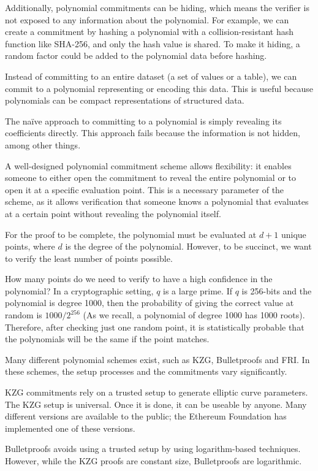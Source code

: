 Additionally, polynomial commitments can be hiding, which means the verifier is not exposed to any information about the polynomial.
For example, we can create a commitment by hashing a polynomial with a collision-resistant hash function like SHA-256, and only the hash value is shared. 
To make it hiding, a random factor could be added to the polynomial data before hashing.

Instead of committing to an entire dataset (a set of values or a table), we can commit to a polynomial representing or encoding this data. 
This is useful because polynomials can be compact representations of structured data.

The naïve approach to committing to a polynomial is simply revealing its coefficients directly.
This approach fails because the information is not hidden, among other things.

A well-designed polynomial commitment scheme allows flexibility: it enables someone to either open the commitment to reveal the entire polynomial or to open it at a specific evaluation point. 
This is a necessary parameter of the scheme, as it allows verification that someone knows a polynomial that evaluates at a certain point without revealing the polynomial itself.

For the proof to be complete, the polynomial must be evaluated at $d+1$ unique points, where $d$ is the degree of the polynomial.
However, to be succinct, we want to verify the least number of points possible.

How many points do we need to verify to have a high confidence in the polynomial?
In a cryptographic setting, $q$ is a large prime. If $q$ is 256-bits and the polynomial is degree 1000, 
then the probability of giving the correct value at random is $1000/2^{256}$ (As we recall, a polynomial of degree 1000 has 1000 roots). 
Therefore, after checking just one random point, it is statistically probable that the polynomials will be the same if the point matches. \cite{VR23}

Many different polynomial schemes exist, such as KZG, Bulletproofs and FRI. 
In these schemes, the setup processes and the commitments vary significantly. 

KZG commitments rely on a trusted setup to generate elliptic curve parameters\cite{KZG}. The KZG setup is universal. Once it is done, it can be useable by anyone. 
Many different versions are available to the public; the Ethereum Foundation has implemented one of these versions. 

Bulletproofs avoids using a trusted setup by using logarithm-based techniques\cite{BP18}. 
However, while the KZG proofs are constant size, Bulletproofs are logarithmic.

